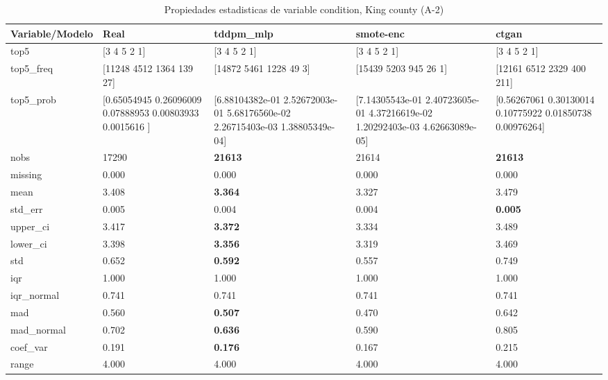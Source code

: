 \begin{table}[H]
\centering
\fontsize{8}{14}\selectfont
\caption{Propiedades  estadisticas de variable condition, King county (A-2)}
\label{table-stats-king county-a-2-condition}
\begin{tabular}{|l|m{10em}|m{10em}|m{10em}|m{10em}|}
\hline
 \rowcolor[gray]{0.8}
Variable/Modelo & Real & tddpm\_mlp & smote-enc & ctgan \\
\hline top5 & [3 4 5 2 1] & [3 4 5 2 1] & [3 4 5 2 1] & [3 4 5 2 1] \\
\hline top5\_freq & [11248  4512  1364   139    27] & [14872  5461  1228    49     3] & [15439  5203   945    26     1] & [12161  6512  2329   400   211] \\
\hline top5\_prob & [0.65054945 0.26096009 0.07888953 0.00803933 0.0015616 ] & [6.88104382e-01 2.52672003e-01 5.68176560e-02 2.26715403e-03
 1.38805349e-04] & [7.14305543e-01 2.40723605e-01 4.37216619e-02 1.20292403e-03
 4.62663089e-05] & [0.56267061 0.30130014 0.10775922 0.01850738 0.00976264] \\
\hline nobs & 17290 & \bfseries 21613 & \cellcolor[rgb]{0.9, 0.54, 0.52} 21614 & \bfseries 21613 \\
\hline missing & 0.000 & 0.000 & 0.000 & 0.000 \\
\hline mean & 3.408 & \bfseries 3.364 & \cellcolor[rgb]{0.9, 0.54, 0.52} 3.327 & 3.479 \\
\hline std\_err & 0.005 & 0.004 & \cellcolor[rgb]{0.9, 0.54, 0.52} 0.004 & \bfseries 0.005 \\
\hline upper\_ci & 3.417 & \bfseries 3.372 & \cellcolor[rgb]{0.9, 0.54, 0.52} 3.334 & 3.489 \\
\hline lower\_ci & 3.398 & \bfseries 3.356 & \cellcolor[rgb]{0.9, 0.54, 0.52} 3.319 & 3.469 \\
\hline std & 0.652 & \bfseries 0.592 & 0.557 & \cellcolor[rgb]{0.9, 0.54, 0.52} 0.749 \\
\hline iqr & 1.000 & 1.000 & 1.000 & 1.000 \\
\hline iqr\_normal & 0.741 & 0.741 & 0.741 & 0.741 \\
\hline mad & 0.560 & \bfseries 0.507 & \cellcolor[rgb]{0.9, 0.54, 0.52} 0.470 & 0.642 \\
\hline mad\_normal & 0.702 & \bfseries 0.636 & \cellcolor[rgb]{0.9, 0.54, 0.52} 0.590 & 0.805 \\
\hline coef\_var & 0.191 & \bfseries 0.176 & 0.167 & \cellcolor[rgb]{0.9, 0.54, 0.52} 0.215 \\
\hline range & 4.000 & 4.000 & 4.000 & 4.000 \\

\end{tabular}
\end{table}
